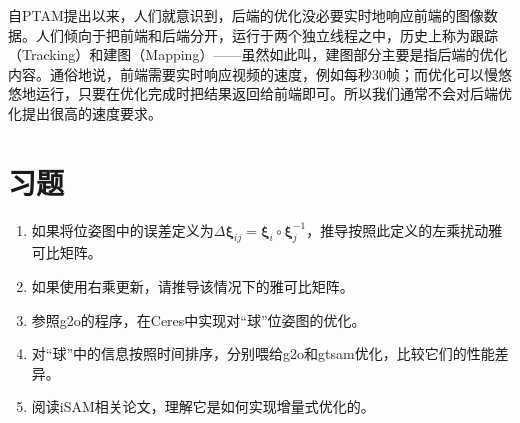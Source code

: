 自PTAM\textsuperscript{\cite{Klein2007}}提出以来，人们就意识到，后端的优化没必要实时地响应前端的图像数据。人们倾向于把前端和后端分开，运行于两个独立线程之中，历史上称为跟踪（Tracking）和建图（Mapping）——虽然如此叫，建图部分主要是指后端的优化内容。通俗地说，前端需要实时响应视频的速度，例如每秒30帧；而优化可以慢悠悠地运行，只要在优化完成时把结果返回给前端即可。所以我们通常不会对后端优化提出很高的速度要求。



\section*{习题}
\begin{enumerate}
	\item 如果将位姿图中的误差定义为$\Delta \bm{\xi}_{ij} = \bm{\xi}_i \circ \bm{\xi}_j^{-1}$，推导按照此定义的左乘扰动雅可比矩阵。
    \item 如果使用右乘更新，请推导该情况下的雅可比矩阵。
	\item 参照g2o的程序，在Ceres中实现对“球”位姿图的优化。
	\item 对“球”中的信息按照时间排序，分别喂给g2o和gtsam优化，比较它们的性能差异。
	\item[\optional] 阅读iSAM相关论文，理解它是如何实现增量式优化的。
\end{enumerate}
